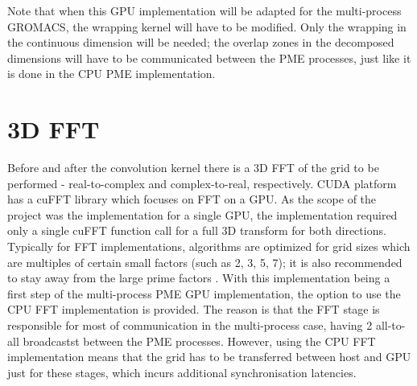 \documentclass[12pt,a4paper]{report}
\begin{document}
Note that when this GPU implementation will be adapted for the multi-process GROMACS, the wrapping kernel will have to be modified. Only the wrapping in the continuous dimension will be needed; the overlap zones in the decomposed dimensions will have to be communicated between the PME processes, just like it is done in the CPU PME implementation. 

\section{3D FFT} \label{FFTimpl}

Before and after the convolution kernel there is a 3D FFT of the grid to be performed - real-to-complex and complex-to-real, respectively. 
CUDA platform has a cuFFT library which focuses on FFT on a GPU. 
As the scope of the project was the implementation for a single GPU, the implementation required only a single cuFFT function call for a full 3D transform for both directions. 
Typically for FFT implementations, algorithms are optimized for grid sizes which are multiples of certain small factors (such as 2, 3, 5, 7); it is also recommended to stay away from the large prime factors \cite{cufft}.
With this implementation being a first step of the multi-process PME GPU implementation, the option to use the CPU FFT implementation is provided. The reason is that the FFT stage is responsible for most of communication in the multi-process case, having 2 all-to-all broadcastst between the PME processes. However, using the CPU FFT implementation means that the grid has to be transferred between host and GPU just for these stages, which incurs additional synchronisation latencies.

\end{document}
